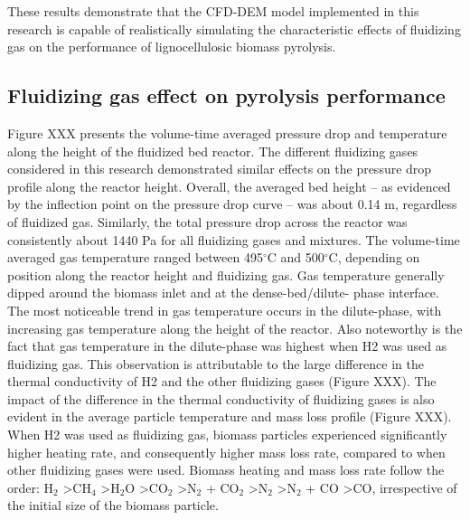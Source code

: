 These results demonstrate that the CFD-DEM model implemented in this research is capable of realistically simulating the characteristic effects of fluidizing gas on the performance of lignocellulosic biomass pyrolysis.



\subsection{Fluidizing gas effect on pyrolysis performance}

Figure XXX presents the volume-time averaged pressure drop and temperature along the height of the fluidized bed reactor. The different fluidizing gases considered in this research demonstrated similar effects on the pressure drop profile along the reactor height. Overall, the averaged bed height – as evidenced by the inflection point on the pressure drop curve – was about 0.14 m, regardless of fluidized gas. Similarly, the total pressure drop across the reactor was consistently about 1440 Pa for all fluidizing gases and mixtures. The volume-time averaged gas temperature ranged between 495$^\circ$C and 500$^\circ$C, depending on position along the reactor height and fluidizing gas. Gas temperature generally dipped around the biomass inlet and at the dense-bed/dilute- phase interface. The most noticeable trend in gas temperature occurs in the dilute-phase, with increasing gas temperature along the height of the reactor. Also noteworthy is the fact that gas temperature in the dilute-phase was highest when H2 was used as fluidizing gas. This observation is attributable to the large difference in the thermal conductivity of H2 and the other fluidizing gases (Figure XXX). The impact of the difference in the thermal conductivity of fluidizing gases is also evident in the average particle temperature and mass loss profile (Figure XXX). When H2 was used as fluidizing gas, biomass particles experienced significantly higher heating rate, and consequently higher mass loss rate, compared to when other fluidizing gases were used. Biomass heating and mass loss rate follow the order: H$_2$ \textgreater CH$_4$ \textgreater H$_2$O \textgreater CO$_2$ \textgreater N$_2$ + CO$_2$ \textgreater N$_2$ \textgreater N$_2$ + CO \textgreater CO, irrespective of the initial size of the biomass particle.

